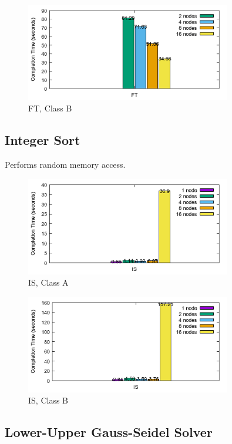 \documentclass[a4paper]{article}
\begin{document}
\begin{figure}[H]
\centering
\includegraphics[width=0.8\textwidth]{figures/FTvB.png}
\caption{\label{fig:FTvB}FT, Class B}
\end{figure}

\subsection{Integer Sort}
Performs random memory access.


\begin{figure}[H]
\centering
\includegraphics[width=0.8\textwidth]{figures/ISvA.png}
\caption{\label{fig:ISvA}IS, Class A}
\end{figure}

\begin{figure}[H]
\centering
\includegraphics[width=0.8\textwidth]{figures/ISvB.png}
\caption{\label{fig:ISvB}IS, Class B}
\end{figure}

\subsection{Lower-Upper Gauss-Seidel Solver}
\end{document}

